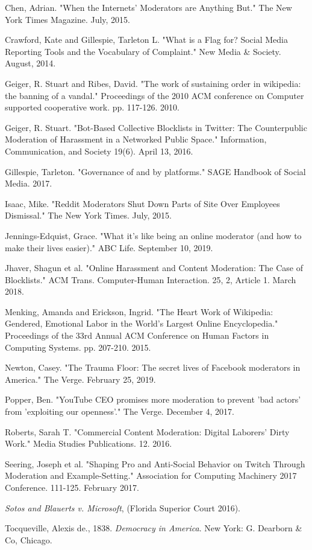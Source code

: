 \documentclass[class=book, crop=false]{standalone}
\begin{document}
Chen, Adrian. "When the Internets' Moderators are Anything But." The New York Times Magazine. July, 2015.

Crawford, Kate and Gillespie, Tarleton L. "What is a Flag for? Social Media Reporting Tools and the Vocabulary of Complaint." New Media \& Society. August, 2014.

Geiger, R. Stuart and Ribes, David. "The work of sustaining order in wikipedia: the banning of a vandal." Proceedings of the 2010 ACM conference on Computer supported cooperative work. pp. 117-126. 2010.

Geiger, R. Stuart. "Bot-Based Collective Blocklists in Twitter: The Counterpublic Moderation of Harassment in a Networked Public Space." Information, Communication, and Society 19(6). April 13, 2016.

Gillespie, Tarleton. "Governance of and by platforms." SAGE Handbook of Social Media. 2017.

Isaac, Mike. "Reddit Moderators Shut Down Parts of Site Over Employees Dismissal." The New York Times. July, 2015.

Jennings-Edquist, Grace. "What it's like being an online moderator (and how to make their lives easier)." ABC Life. September 10, 2019.

Jhaver, Shagun et al. "Online Harassment and Content Moderation: The Case of Blocklists." ACM Trans. Computer-Human Interaction. 25, 2, Article 1. March 2018.

Menking, Amanda and Erickson, Ingrid. "The Heart Work of Wikipedia: Gendered, Emotional Labor in the World's Largest Online Encyclopedia." Proceedings of the 33rd Annual ACM Conference on Human Factors in Computing Systems. pp. 207-210. 2015.

Newton, Casey. "The Trauma Floor: The secret lives of Facebook moderators in America." The Verge. February 25, 2019.

Popper, Ben. "YouTube CEO promises more moderation to prevent 'bad actors' from 'exploiting our openness'." The Verge. December 4, 2017.

Roberts, Sarah T. "Commercial Content Moderation: Digital Laborers' Dirty Work." Media Studies Publications. 12. 2016.

Seering, Joseph et al. "Shaping Pro and Anti-Social Behavior on Twitch Through Moderation and Example-Setting." Association for Computing Machinery 2017 Conference. 111-125. February 2017.

\textit{Sotos and Blauerts v. Microsoft}, (Florida Superior Court 2016).

Tocqueville, Alexis de., 1838. \textit{Democracy in America}. New York: G. Dearborn \& Co, Chicago.
\end{document}
